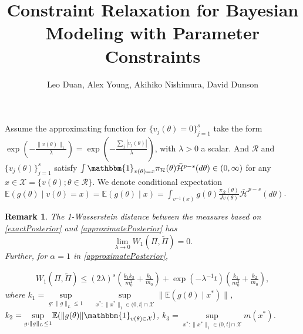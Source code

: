 \documentclass[10pt,fleqn]{article}
\title{\textbf{Constraint Relaxation for Bayesian Modeling with Parameter Constraints}}
\author{Leo Duan,  Alex Young, Akihiko Nishimura, David Dunson}
\date{}
\newtheorem{remark}{Remark}
\newcommand{\mc}[1]{\mathcal{#1}}
\DeclareMathOperator{\1}{\mathbbm{1}}
\begin{document}
\maketitle
{}

Assume the approximating function for $\{v_{j}(\theta)=0\}_{j=1}^s$ take the form
$\exp(-\frac{ \|v(\theta)\|_1}{\lambda})=\exp(-\frac{ \sum_j|v_j(\theta)|}{\lambda})$, with $\lambda >0$ a scalar. And
$\mc R$ and $\{v_j(\theta)\}_{j=1}^s$ satisfy $\int \mathbbm{1}_{v(\theta)= x } \pi_{\mc R}(\theta)  \bar{\mc H}^{p-s}(d\theta) \in (0,\infty)$  for any $x\in \mathcal
X =\{v(\theta);\theta\in \mc R\}$.
We denote conditional expectation $\mathbb{E}(g(\theta) \mid v(\theta)=x)=\mathbb{E}(g(\theta) \mid  x)=\int_{v^{-1}(x)} g(\theta)\frac{\pi_{\mc R}(\theta)}{Jv(\theta)}  \bar{\mc H}^{p-s}(d \theta)$. 
\begin{remark}
The 1-Wasserstein distance between the measures based on \eqref{exactPosterior} and \eqref{approximatePosterior} has
$$ \underset{\lambda \rightarrow 0}\lim W_1(\Pi,\tilde\Pi)=0.$$
Further, for $\alpha=1$ in \eqref{approximatePosterior},

\begin{equation}
\begin{aligned}
W_1(\Pi,\tilde\Pi) \le  (2\lambda)^{s} (\frac{k_1 k_3}{m_0^2} + \frac{k_1}{m_0}) + \exp(- \lambda^{-1} t )(\frac{k_1}{m_0^2} + \frac{k_2}{m_0}),
\end{aligned}
\end{equation}
where $k_1= \underset{g:\|g\|_L\le 1}\sup \quad \underset{x^{*}:\|x^{*}\|_1\in(0,t]\cap
\mathcal X}\sup\|\mathbb{E}(g(\theta) \mid x^*)\|$, $k_2=\underset{g:\|g\|_L\le 1} \sup \mathbb{E}(\| g(\theta )\| \mathbbm{1}_{v(\theta)\in
\mathcal X}) $, $k_3= \underset{x^{*}:\|x^{*}\|_1\in(0,t]\cap
\mathcal X}\sup m(x^{*})$.
\end{remark}
\end{document}
